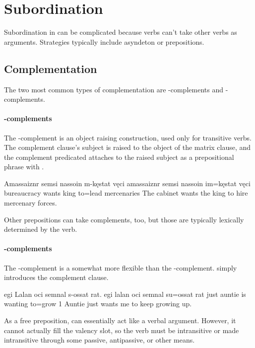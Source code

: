 \section{Subordination}
Subordination in \langname{} can be complicated because verbs can't take other verbs as arguments. Strategies typically include asyndeton or prepositions.

\subsection{Complementation}
The two most common types of complementation are -complements and -complements.

\paragraph{-complements}
The -complement is an object raising construction, used only for transitive verbs. The complement clause's subject is raised to the object of the matrix clause, and the complement predicated attaches to the raised subject as a prepositional phrase with .

\begin{example}
    \script Amassaiznr semsi nassoin m-kęstat vęci
    \bits amassaiznr semsi nassoin im=kęstat vęci
    \gloss bureaucracy wants king to=lead mercenaries
    \tr The cabinet wants the king to hire mercenary forces.
\end{example}

Other prepositions can take complements, too, but those are typically lexically determined by the verb.

\paragraph{-complements}
The -complement is a somewhat more flexible than the -complement.  simply introduces the complement clause.

\begin{example}
    \script egi Lalan oci semnal s-ossat rat.
    \bits egi  lalan  oci semnal  su=ossat rat
    \gloss just auntie is wanting to=grow 1
    \tr Auntie just wants me to keep growing up.
\end{example}

As a free preposition,  can essentially act like a verbal argument. However, it cannot actually fill the valency slot, so the verb must be intransitive or made intransitive through some passive, antipassive, or other means.

